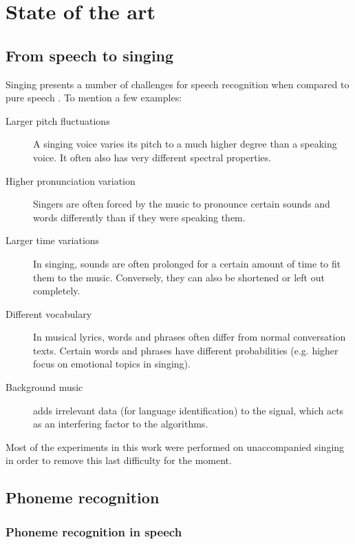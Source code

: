\chapter{State of the art}	\label{chap:sota}
\section{From speech to singing}
Singing presents a number of challenges for speech recognition when compared to pure speech \cite{goto_alignment}. To mention a few examples:
\begin{description}
 \item[Larger pitch fluctuations] A singing voice varies its pitch to a much higher degree than a speaking voice. It often also has very different spectral properties.
 \item[Higher pronunciation variation] Singers are often forced by the music to pronounce certain sounds and words differently than if they were speaking them.
 \item[Larger time variations] In singing, sounds are often prolonged for a certain amount of time to fit them to the music. Conversely, they can also be shortened or left out completely.
 \item[Different vocabulary] In musical lyrics, words and phrases often differ from normal conversation texts. Certain words and phrases have different probabilities (e.g. higher focus on emotional topics in singing).
 \item[Background music] adds irrelevant data (for language identification) to the signal, which acts as an interfering factor to the algorithms.
 \end{description}
Most of the experiments in this work were performed on unaccompanied singing in order to remove this last difficulty for the moment.

\section{Phoneme recognition}
\subsection{Phoneme recognition in speech}
